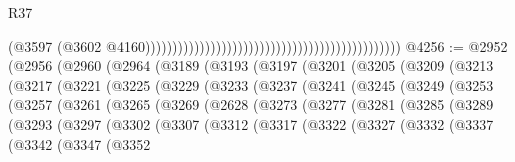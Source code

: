 \begin{lexlean}{R37}
\begin{coremodule}
                                                                                              (@3597
                                                                                                (@3602
                                                                                                  @4160)))))))))))))))))))))))))))))))))))))))))))))))
@4256 := @2952
    (@2956
      (@2960
        (@2964
          (@3189
            (@3193
              (@3197
                (@3201
                  (@3205
                    (@3209
                      (@3213
                        (@3217
                          (@3221
                            (@3225
                              (@3229
                                (@3233
                                  (@3237
                                    (@3241
                                      (@3245
                                        (@3249
                                          (@3253
                                            (@3257
                                              (@3261
                                                (@3265
                                                  (@3269
                                                    (@2628
                                                      (@3273
                                                        (@3277
                                                          (@3281
                                                            (@3285
                                                              (@3289
                                                                (@3293
                                                                  (@3297
                                                                    (@3302
                                                                      (@3307
                                                                        (@3312
                                                                          (@3317
                                                                            (@3322
                                                                              (@3327
                                                                                (@3332
                                                                                  (@3337
                                                                                    (@3342
                                                                                      (@3347
                                                                                        (@3352

\end{coremodule}
\end{lexlean}
